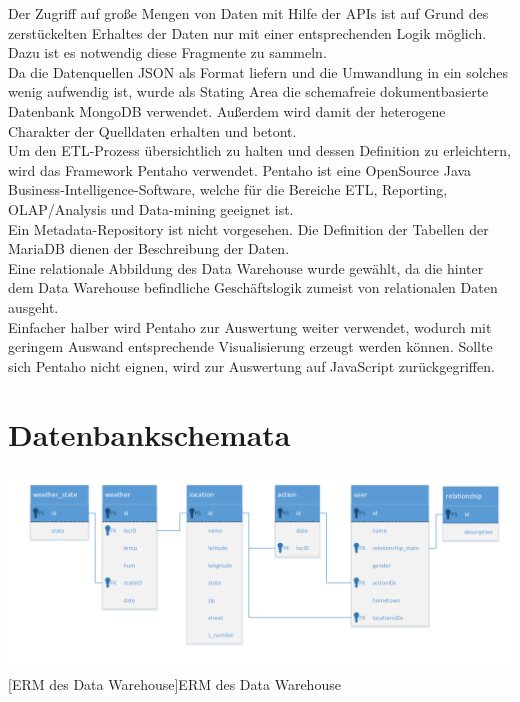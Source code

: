 \documentclass[a4paper,12pt]{scrartcl}
\makeatletter
\def\ScaleIfNeeded{%
\ifdim\Gin@nat@width>\linewidth
\linewidth
\else
\Gin@nat@width
\fi
}
\makeatother
\begin{document}
Der Zugriff auf große Mengen von Daten mit Hilfe der APIs ist auf Grund des zerstückelten Erhaltes der Daten nur mit einer entsprechenden Logik möglich. Dazu ist es notwendig diese Fragmente zu sammeln.\\
Da die Datenquellen JSON als Format liefern und die Umwandlung in ein solches wenig aufwendig ist, wurde als Stating Area die schemafreie dokumentbasierte Datenbank MongoDB verwendet. Außerdem wird damit der heterogene Charakter der Quelldaten erhalten und betont.\\

Um den ETL-Prozess übersichtlich zu halten und dessen Definition zu erleichtern, wird das Framework Pentaho verwendet. Pentaho ist eine OpenSource Java Business-Intelligence-Software, welche für die Bereiche ETL, Reporting, OLAP/Analysis und Data-mining geeignet ist.\\

Ein Metadata-Repository ist nicht vorgesehen. Die Definition der Tabellen der MariaDB dienen der Beschreibung der Daten.\\
Eine relationale Abbildung des Data Warehouse wurde gewählt, da die hinter dem Data Warehouse befindliche Geschäftslogik zumeist von relationalen Daten ausgeht.\\

Einfacher halber wird Pentaho zur Auswertung weiter verwendet, wodurch mit geringem Auswand entsprechende Visualisierung erzeugt werden können. Sollte sich Pentaho nicht eignen, wird zur Auswertung auf JavaScript zurückgegriffen.


\section{Datenbankschemata}



\begin{center}
\centering
\includegraphics[width=\ScaleIfNeeded]{../Data_Warehouse_ERM.pdf}%
[ERM des Data Warehouse]{ERM des Data Warehouse}%
\end{center}
\end{document}

